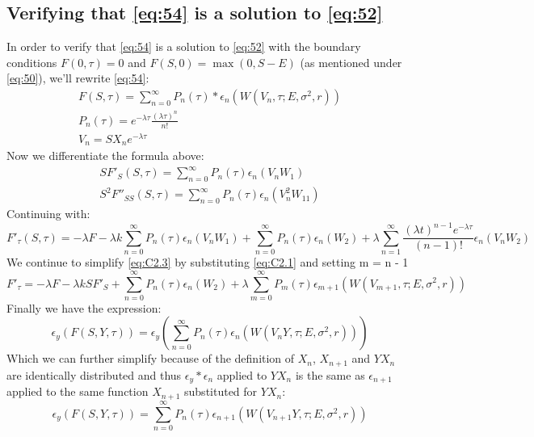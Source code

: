 \documentclass{article}
\begin{document}
\subsection{Verifying that \ref{eq:54} is a solution to \ref{eq:52}}
In order to verify that \ref{eq:54} is a solution to \ref{eq:52} with the boundary conditions $F(0, \tau) = 0$ and $F(S, 0) = \max(0, S - E)$ (as mentioned under \ref{eq:50}), we'll rewrite \ref{eq:54}:
\begin{gather}
    F(S, \tau) = \sum_{n=0} ^{\infty} P_n(\tau) * \epsilon_n(W(V_n, \tau; E, \sigma^2, r))\\
    P_n(\tau) = e^{-\lambda \tau} \frac{(\lambda \tau)^n}{n!}\\
    V_n = S X_n e^{-\lambda \tau}
\end{gather}
Now we differentiate the formula above:
\begin{gather}
    S F'_S(S, \tau) = \sum_{n=0}^{\infty} P_n(\tau) \epsilon_n(V_n W_1) \label{eq:C2.1}\\
    S^2 F''_{SS}(S, \tau) = \sum_{n=0}^{\infty} P_n(\tau) \epsilon_n(V_n^2 W_{11}) \label{eq:C2.2}
\end{gather}
Continuing with:
\begin{equation}\label{eq:C2.3}
    F'_{\tau}(S, \tau) = - \lambda F - \lambda k \sum_{n=0}^{\infty} P_n(\tau) \epsilon_n(V_n W_1) + \sum_{n=0}^{\infty} P_n(\tau) \epsilon_n(W_2) + \lambda \sum_{n=1}^{\infty} \frac{(\lambda t)^{n-1} e^{-\lambda \tau}}{(n - 1)!} \epsilon_n(V_n W_2)
\end{equation}
We continue to simplify \ref{eq:C2.3} by substituting \ref{eq:C2.1} and setting m = n - 1
\begin{equation}\label{C2.3.1}
    F'_{\tau} = - \lambda F - \lambda k S F'_{S} + \sum_{n=0}^{\infty} P_n(\tau) \epsilon_n(W_2) + \lambda \sum_{m=0}^{\infty} P_m(\tau) \epsilon_{m+1}(W(V_{m+1}, \tau; E, \sigma^2, r))
\end{equation}
Finally we have the expression:
\begin{equation}\label{eq:C2.4}
    \epsilon_y(F(S, Y, \tau)) = \epsilon_y\left(\sum_{n=0}^{\infty} P_n(\tau) \epsilon_n(W(V_n Y, \tau; E, \sigma^2, r))\right)
\end{equation}
Which we can further simplify because of the definition of $X_n$, $X_{n+1}$ and $Y X_n$ are identically distributed and thus $\epsilon_y * \epsilon_n$ applied to $Y X_n$ is the same as $\epsilon_{n+1}$ applied to the same function $X_{n+1}$ substituted for $Y X_n$:
\begin{equation}\label{C2.4.1}
    \epsilon_y(F(S, Y, \tau)) = \sum_{n=0}^{\infty} P_n(\tau) \epsilon_{n+1}(W(V_{n+1} Y, \tau; E, \sigma^2, r))
\end{equation}
\end{document}
